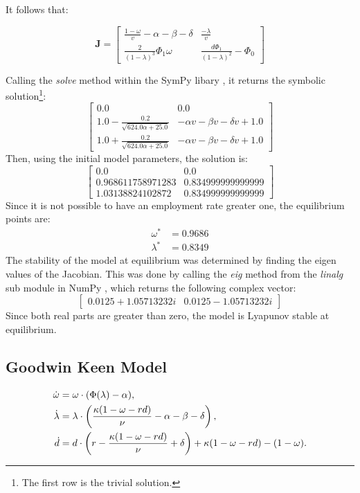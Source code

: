 \documentclass[12pt, centerh1]{article}
\begin{document}
\noindent
It follows that:

\[
\mathbf J =
\begin{bmatrix}
    \frac{1-\omega}{v}-\alpha-\beta-\delta & \frac{-\lambda}{v}\\[1ex]
    \frac{2}{(1-\lambda)^3}\Phi_1\omega & \frac{d\Phi_1}{(1-\lambda)^2}-\Phi_0
\end{bmatrix}
\]


\noindent
Calling the \textit{solve} method within the SymPy libary \citep{SymPy}, it returns the symbolic solution\footnote{The first row is the trivial solution.}:
\[
\begin{bmatrix}
    0.0 & 0.0\\[1ex]
    1.0-\frac{0.2}{\sqrt{624.0\alpha+25.0}} & -\alpha v - \beta v -\delta v +1.0\\[1ex]
    1.0+\frac{0.2}{\sqrt{624.0\alpha+25.0}}& -\alpha v - \beta v -\delta v + 1.0 
\end{bmatrix}
\]
\noindent
Then, using the initial model parameters, the solution is:
\[
\begin{bmatrix}
    0.0 & 0.0\\[1ex]
    0.968611758971283 & 0.834999999999999\\[1ex]
    1.03138824102872 & 0.834999999999999 
\end{bmatrix}
\]
Since it is not possible to have an employment rate greater one, the equilibrium points are:
\begin{align*}
    \omega^* &= 0.9686\\
    \lambda^* &= 0.8349
\end{align*}
The stability of the model at equilibrium was determined by finding the eigen values of the Jacobian. This was done by calling the \textit{eig} method from the \textit{linalg} sub module in NumPy \citep{2020NumPy-Array}, which returns the following complex vector:
\[
\begin{bmatrix}
    0.0125+1.05713232i & 0.0125-1.05713232i
\end{bmatrix}
\]
Since both real parts are greater than zero, the model is Lyapunov stable at equilibrium.

\subsection{Goodwin Keen Model}

\begin{align*} 
\centering
    \dot{\omega} &= \omega \cdot (\Phi(\lambda) - \alpha),\\
    \dot{\lambda} &= \lambda \cdot \left( \frac{\kappa(1-\omega-rd)}{\nu} - \alpha - \beta - \delta \right),\\ 
    \dot{d} &= d\cdot\left(r-\frac{\kappa(1-\omega-rd)}{\nu}+\delta\right)+\kappa(1-\omega-rd)-(1-\omega). 
\end{align*}
\end{document}
